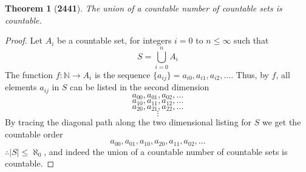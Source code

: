 \documentclass[preview]{standalone}
\newtheorem*{theorem*}{Theorem}
\begin{document}
\begin{theorem*}[\textbf{2441}]
    The union of a countable number of countable sets is countable.
\end{theorem*}

\begin{proof}
    Let $A_i$ be a countable set, for integers $i=0$ to $n \leq \infty$ 
    such that
    $$S = \bigcup_{i=0}^{n} A_i$$ 
    The function $f: \mathbb{N} \rightarrow A_i$ is the sequence 
    $\{a_{ij}\} = a_{i0}, a_{i1}, a_{i2}, \dots$. 
    Thus, by $f$, all elements $a_{ij}$ in $S$ can be listed in the second dimension
    $$a_{00}, a_{01}, a_{02}, \dots$$
    $$a_{10}, a_{11}, a_{12}, \dots$$
    $$a_{20}, a_{21}, a_{22}, \dots$$
    $$\vdots$$
    By tracing the diagonal path along the two 
    dimensional listing for $S$ we get the countable order 
    $$a_{00}, a_{01}, a_{10}, a_{20}, a_{11}, a_{02}, \dots$$
    $\therefore |S| \leq \aleph_0$, and indeed the union of a countable number of 
    countable sets is countable.
\color{lightgray} \end{proof}
\end{document}
